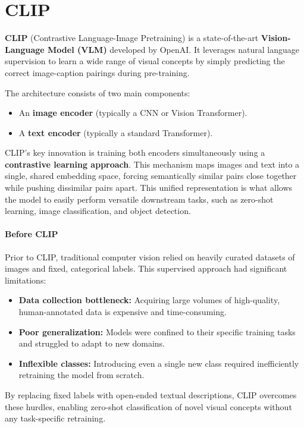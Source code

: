 \section{CLIP}
\textbf{CLIP} (Contrastive Language-Image Pretraining) is a state-of-the-art \textbf{Vision-Language Model (VLM)} developed by OpenAI. 
It leverages natural language supervision to learn a wide range of visual concepts by simply predicting the correct image-caption pairings during pre-training.

The architecture consists of two main components:
\begin{itemize}
    \item An \textbf{image encoder} (typically a CNN or Vision Transformer).
    \item A \textbf{text encoder} (typically a standard Transformer).
\end{itemize}

CLIP's key innovation is training both encoders simultaneously using a \textbf{contrastive learning approach}. 
This mechanism maps images and text into a single, shared embedding space, forcing semantically similar pairs close together while pushing dissimilar pairs apart. 
This unified representation is what allows the model to easily perform versatile downstream tasks, such as zero-shot learning, image classification, and object detection.

\paragraph{Before CLIP}
Prior to CLIP, traditional computer vision relied on heavily curated datasets of images and fixed, categorical labels. This supervised approach had significant limitations:

\begin{itemize}
    \item \textbf{Data collection bottleneck:} Acquiring large volumes of high-quality, human-annotated data is expensive and time-consuming.
    \item \textbf{Poor generalization:} Models were confined to their specific training tasks and struggled to adapt to new domains.
    \item \textbf{Inflexible classes:} Introducing even a single new class required inefficiently retraining the model from scratch.
\end{itemize}

By replacing fixed labels with open-ended textual descriptions, CLIP overcomes these hurdles, enabling zero-shot classification of novel visual concepts without any task-specific retraining.

